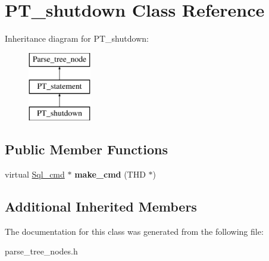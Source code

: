 \hypertarget{classPT__shutdown}{}\section{P\+T\+\_\+shutdown Class Reference}
\label{classPT__shutdown}
Inheritance diagram for P\+T\+\_\+shutdown\+:\begin{figure}[H]
\begin{center}
\leavevmode
\includegraphics[height=3.000000cm]{classPT__shutdown}
\end{center}
\end{figure}
\subsection*{Public Member Functions}
\begin{DoxyCompactItemize}
\item 
\mbox{\label{classPT__shutdown_a13a27bab092bf71228bd07d25a0ef82a}} 
virtual \mbox{\hyperlink{classSql__cmd}{Sql\+\_\+cmd}} $\ast$ {\bfseries make\+\_\+cmd} (T\+HD $\ast$)
\end{DoxyCompactItemize}
\subsection*{Additional Inherited Members}


The documentation for this class was generated from the following file\+:\begin{DoxyCompactItemize}
\item 
parse\+\_\+tree\+\_\+nodes.\+h\end{DoxyCompactItemize}
